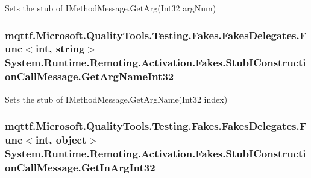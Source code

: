 Sets the stub of I\-Method\-Message.\-Get\-Arg(\-Int32 arg\-Num)

\hypertarget{class_system_1_1_runtime_1_1_remoting_1_1_activation_1_1_fakes_1_1_stub_i_construction_call_message_a16e741f2a31b393d19b989c218099c3a}{
\subsubsection[{Get\-Arg\-Name\-Int32}]{\setlength{\rightskip}{0pt plus 5cm}mqttf.\-Microsoft.\-Quality\-Tools.\-Testing.\-Fakes.\-Fakes\-Delegates.\-Func$<$int, string$>$ System.\-Runtime.\-Remoting.\-Activation.\-Fakes.\-Stub\-I\-Construction\-Call\-Message.\-Get\-Arg\-Name\-Int32}}\label{class_system_1_1_runtime_1_1_remoting_1_1_activation_1_1_fakes_1_1_stub_i_construction_call_message_a16e741f2a31b393d19b989c218099c3a}


Sets the stub of I\-Method\-Message.\-Get\-Arg\-Name(\-Int32 index)

\hypertarget{class_system_1_1_runtime_1_1_remoting_1_1_activation_1_1_fakes_1_1_stub_i_construction_call_message_ae0123da4478a7d2ff4e379e5ef5bf1cc}{
\subsubsection[{Get\-In\-Arg\-Int32}]{\setlength{\rightskip}{0pt plus 5cm}mqttf.\-Microsoft.\-Quality\-Tools.\-Testing.\-Fakes.\-Fakes\-Delegates.\-Func$<$int, object$>$ System.\-Runtime.\-Remoting.\-Activation.\-Fakes.\-Stub\-I\-Construction\-Call\-Message.\-Get\-In\-Arg\-Int32}}\label{class_system_1_1_runtime_1_1_remoting_1_1_activation_1_1_fakes_1_1_stub_i_construction_call_message_ae0123da4478a7d2ff4e379e5ef5bf1cc}


